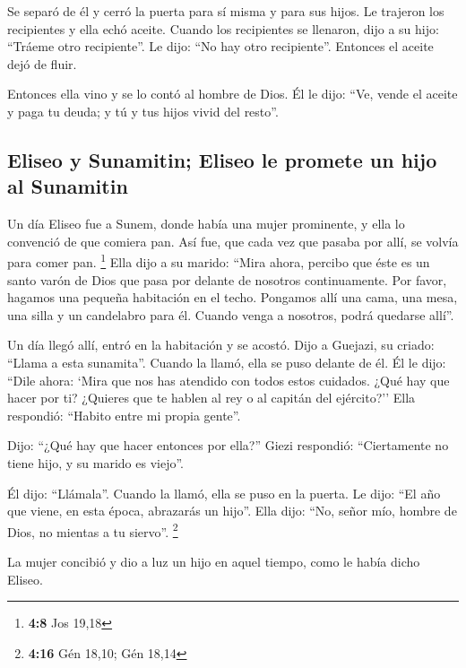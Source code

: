 \begin{paracol}{2}
 Se separó de él y cerró la puerta para sí misma y para
sus hijos. Le trajeron los recipientes y ella echó aceite.
 Cuando los recipientes se llenaron, dijo a su hijo:
``Tráeme otro recipiente''. Le dijo: ``No hay otro recipiente''.
Entonces el aceite dejó de fluir.

 Entonces ella vino y se lo contó al hombre de Dios. Él le
dijo: ``Ve, vende el aceite y paga tu deuda; y tú y tus hijos vivid del
resto''.

\hypertarget{eliseo-y-sunamitin-eliseo-le-promete-un-hijo-al-sunamitin}{%
\subsection{Eliseo y Sunamitin; Eliseo le promete un hijo al
Sunamitin}\label{eliseo-y-sunamitin-eliseo-le-promete-un-hijo-al-sunamitin}}

 Un día Eliseo fue a Sunem, donde había una mujer
prominente, y ella lo convenció de que comiera pan. Así fue, que cada
vez que pasaba por allí, se volvía para comer pan. \footnote{\textbf{4:8}
  Jos 19,18}  Ella dijo a su marido: ``Mira ahora, percibo
que éste es un santo varón de Dios que pasa por delante de nosotros
continuamente.  Por favor, hagamos una pequeña habitación
en el techo. Pongamos allí una cama, una mesa, una silla y un candelabro
para él. Cuando venga a nosotros, podrá quedarse allí''.

 Un día llegó allí, entró en la habitación y se acostó.
 Dijo a Guejazi, su criado: ``Llama a esta sunamita''.
Cuando la llamó, ella se puso delante de él.  Él le dijo:
``Dile ahora: `Mira que nos has atendido con todos estos cuidados. ¿Qué
hay que hacer por ti? ¿Quieres que te hablen al rey o al capitán del
ejército?'' Ella respondió: ``Habito entre mi propia gente''.

 Dijo: ``¿Qué hay que hacer entonces por ella?'' Giezi
respondió: ``Ciertamente no tiene hijo, y su marido es viejo''.

 Él dijo: ``Llámala''. Cuando la llamó, ella se puso en
la puerta.  Le dijo: ``El año que viene, en esta época,
abrazarás un hijo''. Ella dijo: ``No, señor mío, hombre de Dios, no
mientas a tu siervo''. \footnote{\textbf{4:16} Gén 18,10; Gén 18,14}

 La mujer concibió y dio a luz un hijo en aquel tiempo,
como le había dicho Eliseo.


\end{paracol}
